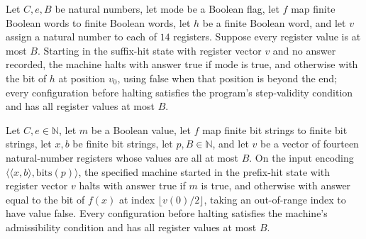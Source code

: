\begin{lemma}
\label{Complexity.comp_suffix_hit}
\leanok
{}
Let $C,e,B$ be natural numbers, let $\text{mode}$ be a Boolean flag, let $f$ map finite
Boolean words to finite Boolean words, let $h$ be a finite Boolean word, and let $v$
assign a natural number to each of $14$ registers. Suppose every register value is at
most $B$. Starting in the suffix-hit state with register vector $v$ and no answer
recorded, the machine halts with answer true if $\text{mode}$ is true, and otherwise with
the bit of $h$ at position $v_0$, using false when that position is beyond the end;
every configuration before halting satisfies the program's step-validity condition and
has all register values at most $B$.
\end{lemma}

\begin{lemma}
\label{Complexity.comp_prefix_hit}
\leanok
{}
Let $C,e\in\mathbb{N}$, let $m$ be a Boolean value, let $f$ map finite bit strings to
finite bit strings, let $x,b$ be finite bit strings, let $p,B\in\mathbb{N}$, and let $v$
be a vector of fourteen natural-number registers whose values are all at most $B$. On
the input encoding $\langle\langle x,b\rangle,\mathrm{bits}(p)\rangle$, the specified
machine started in the prefix-hit state with register vector $v$ halts with answer true
if $m$ is true, and otherwise with answer equal to the bit of $f(x)$ at index $\lfloor
v(0)/2\rfloor$, taking an out-of-range index to have value false. Every configuration
before halting satisfies the machine's admissibility condition and has all register
values at most $B$.
\end{lemma}

